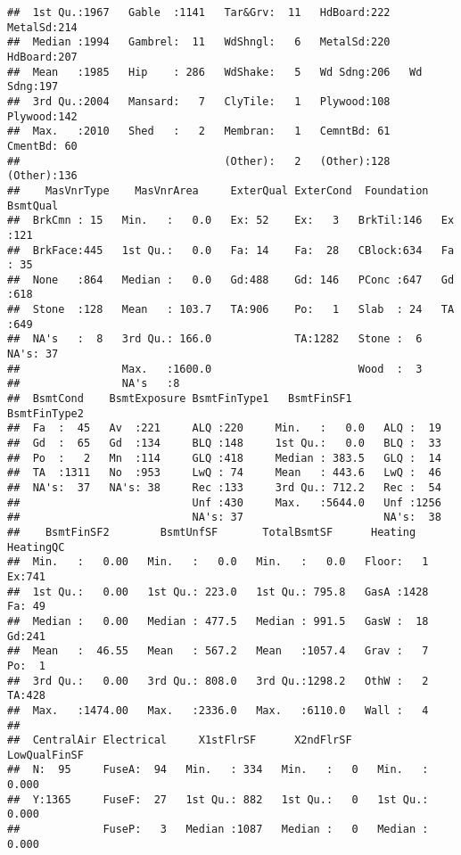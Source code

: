 \documentclass[
]{article}
\begin{document}
\begin{verbatim}
##  1st Qu.:1967   Gable  :1141   Tar&Grv:  11   HdBoard:222   MetalSd:214  
##  Median :1994   Gambrel:  11   WdShngl:   6   MetalSd:220   HdBoard:207  
##  Mean   :1985   Hip    : 286   WdShake:   5   Wd Sdng:206   Wd Sdng:197  
##  3rd Qu.:2004   Mansard:   7   ClyTile:   1   Plywood:108   Plywood:142  
##  Max.   :2010   Shed   :   2   Membran:   1   CemntBd: 61   CmentBd: 60  
##                                (Other):   2   (Other):128   (Other):136  
##    MasVnrType    MasVnrArea     ExterQual ExterCond  Foundation  BsmtQual  
##  BrkCmn : 15   Min.   :   0.0   Ex: 52    Ex:   3   BrkTil:146   Ex  :121  
##  BrkFace:445   1st Qu.:   0.0   Fa: 14    Fa:  28   CBlock:634   Fa  : 35  
##  None   :864   Median :   0.0   Gd:488    Gd: 146   PConc :647   Gd  :618  
##  Stone  :128   Mean   : 103.7   TA:906    Po:   1   Slab  : 24   TA  :649  
##  NA's   :  8   3rd Qu.: 166.0             TA:1282   Stone :  6   NA's: 37  
##                Max.   :1600.0                       Wood  :  3             
##                NA's   :8                                                   
##  BsmtCond    BsmtExposure BsmtFinType1   BsmtFinSF1     BsmtFinType2
##  Fa  :  45   Av  :221     ALQ :220     Min.   :   0.0   ALQ :  19   
##  Gd  :  65   Gd  :134     BLQ :148     1st Qu.:   0.0   BLQ :  33   
##  Po  :   2   Mn  :114     GLQ :418     Median : 383.5   GLQ :  14   
##  TA  :1311   No  :953     LwQ : 74     Mean   : 443.6   LwQ :  46   
##  NA's:  37   NA's: 38     Rec :133     3rd Qu.: 712.2   Rec :  54   
##                           Unf :430     Max.   :5644.0   Unf :1256   
##                           NA's: 37                      NA's:  38   
##    BsmtFinSF2        BsmtUnfSF       TotalBsmtSF      Heating     HeatingQC
##  Min.   :   0.00   Min.   :   0.0   Min.   :   0.0   Floor:   1   Ex:741   
##  1st Qu.:   0.00   1st Qu.: 223.0   1st Qu.: 795.8   GasA :1428   Fa: 49   
##  Median :   0.00   Median : 477.5   Median : 991.5   GasW :  18   Gd:241   
##  Mean   :  46.55   Mean   : 567.2   Mean   :1057.4   Grav :   7   Po:  1   
##  3rd Qu.:   0.00   3rd Qu.: 808.0   3rd Qu.:1298.2   OthW :   2   TA:428   
##  Max.   :1474.00   Max.   :2336.0   Max.   :6110.0   Wall :   4            
##                                                                            
##  CentralAir Electrical     X1stFlrSF      X2ndFlrSF     LowQualFinSF    
##  N:  95     FuseA:  94   Min.   : 334   Min.   :   0   Min.   :  0.000  
##  Y:1365     FuseF:  27   1st Qu.: 882   1st Qu.:   0   1st Qu.:  0.000  
##             FuseP:   3   Median :1087   Median :   0   Median :  0.000  

\end{verbatim}
\end{document}
